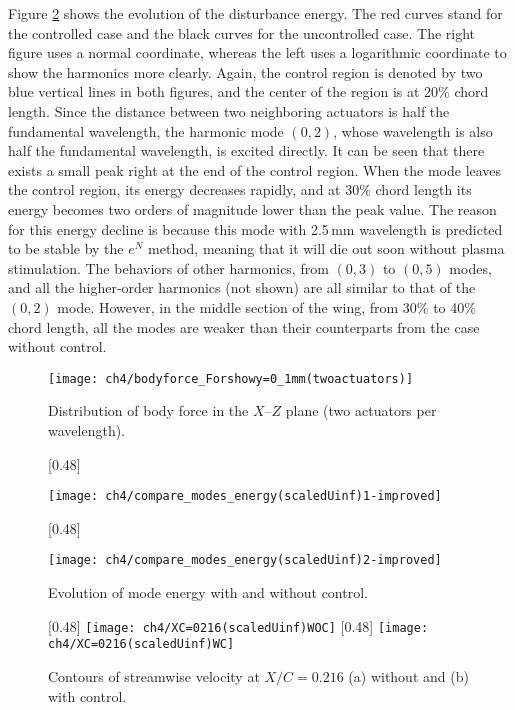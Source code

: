 Figure \ref{f:basecase} shows the evolution of the disturbance energy. The red curves stand for the controlled case and the black curves for the uncontrolled case. The right figure uses a normal coordinate, whereas the left uses a logarithmic coordinate to show the harmonics more clearly. Again, the control region is denoted by two blue vertical lines in both figures, and the center of the region is at 20\% chord length. Since the distance between two neighboring actuators is half the fundamental wavelength, the harmonic mode $(0,2)$, whose wavelength is also half  the fundamental wavelength, is excited directly. It can be seen that there exists a small peak right at the end of the control region. When the mode leaves  the control region, its energy decreases rapidly, and at 30\% chord length its energy becomes two orders of magnitude lower than the peak value. The reason for this energy decline is because this mode with 2.5\,mm wavelength is predicted to be stable by the $e^{N}$ method, meaning that it will die out soon without plasma stimulation. The behaviors of other harmonics,  from $(0,3)$ to $(0,5)$ modes, and all the higher-order harmonics (not shown) are all similar to that of the  $(0,2)$ mode. However, in the middle section of the wing, from 30\% to 40\% chord length, all the modes are weaker than their counterparts from the case without control.
\begin{figure}
\centering
  \texttt{[image: ch4/bodyforce\_Forshowy=0\_1mm(twoactuators)]}
  \caption{Distribution of  body force in the $X$--$Z$ plane (two actuators per wavelength).}%
  \label{f:force2perwavelength}
\end{figure}
\begin{figure}
\centering
  \subcaptionbox{\label{f:basecase_a}}[0.48\textwidth]{

    \texttt{[image: ch4/compare\_modes\_energy(scaledUinf)1-improved]}}
  \subcaptionbox{\label{f:basecase_b}}[0.48\textwidth]{

    \texttt{[image: ch4/compare\_modes\_energy(scaledUinf)2-improved]}}
  \caption{Evolution of mode energy with and without control.}%
  \label{f:basecase}
\end{figure}

\begin{figure}
\centering
\subcaptionbox{\label{fig:ContU0216WOC}}[0.48\linewidth]{           %
\texttt{[image: ch4/XC=0216(scaledUinf)WOC]}}
\subcaptionbox{\label{fig:ContU0216WC}}[0.48\linewidth]{
\texttt{[image: ch4/XC=0216(scaledUinf)WC]}}
\caption{Contours of streamwise velocity at $X/C=0.216$ (a) without  and (b) with control.}
\label{fig:ContU0216} %
\end{figure}

